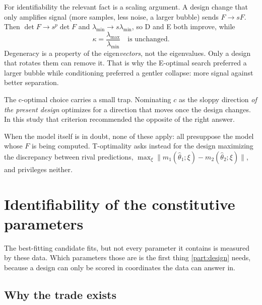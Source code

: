 \documentclass[10pt]{article}
\begin{document}
For identifiability the relevant fact is a scaling argument. A design change that only
amplifies signal (more samples, less noise, a larger bubble) sends $F \to sF$. Then
$\det F \to s^p\det F$ and $\lambda_{\min}\to s\lambda_{\min}$, so D and E both improve,
while
%
\begin{equation}
\kappa = \frac{\lambda_{\max}}{\lambda_{\min}} \quad\text{is unchanged.}
\end{equation}
%
Degeneracy is a property of the eigen\emph{vectors}, not the eigenvalues. Only a design that
rotates them can remove it. That is why the E-optimal search preferred a larger bubble while
conditioning preferred a gentler collapse: more signal against better separation.

The c-optimal choice carries a small trap. Nominating $c$ as the sloppy direction \emph{of the
present design} optimizes for a direction that moves once the design changes. In this study
that criterion recommended the opposite of the right answer.

When the model itself is in doubt, none of these apply: all presuppose the model whose $F$ is
being computed. T-optimality asks instead for the design maximizing the discrepancy
between rival predictions, $\max_\xi \|m_1(\hat\theta_1;\xi) - m_2(\hat\theta_2;\xi)\|$, and
privileges neither.

\section{Identifiability of the constitutive parameters}

The best-fitting candidate fits, but not every parameter it contains is measured by these data.
Which parameters those are is the first thing \cref{part:design} needs, because a design can
only be scored in coordinates the data can answer in.

\subsection*{Why the trade exists}
\end{document}
